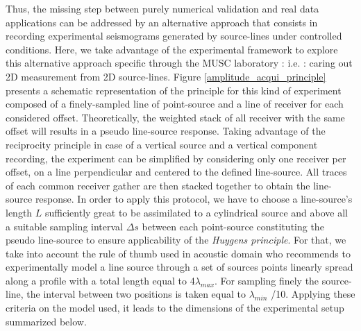 \documentclass[manuscript,revised]{geophysics}
\begin{document}
\noindent Thus, the missing step between purely numerical validation and real data applications can be addressed by an alternative approach that consists in recording experimental seismograms generated by source-lines under controlled conditions. Here, we take advantage of the experimental framework to explore this alternative approach specific through the MUSC laboratory : i.e. : caring out 2D measurement from 2D source-lines. Figure \ref{amplitude_acqui_principle} presents a schematic representation of the principle for this kind of experiment composed of a finely-sampled line of point-source and a line of receiver for each considered offset. Theoretically, the weighted stack of all receiver with the same offset will results in a pseudo line-source response. Taking advantage of the reciprocity principle in case of a vertical source and a vertical component recording, the experiment can be simplified by considering only one receiver per offset, on a line perpendicular and centered to the defined line-source. All traces of each common receiver gather are then stacked together to obtain the line-source response. In order to apply this protocol, we have to choose a line-source's length $L$ sufficiently great to be assimilated to a cylindrical source and above all a suitable sampling interval $\Delta s$ between each point-source constituting the pseudo line-source to ensure applicability of the \textit{Huygens principle}. For that, we take into account the rule of thumb used in acoustic domain who recommends to experimentally model a line source through a set of sources points linearly spread along a profile with a total length equal to 4$\lambda_{max}$. For sampling finely the source-line, the interval between two positions is taken equal to  $\lambda_{min}$ /10. Applying these criteria on the model used, it leads to the dimensions of the experimental setup summarized below. 
\end{document}
